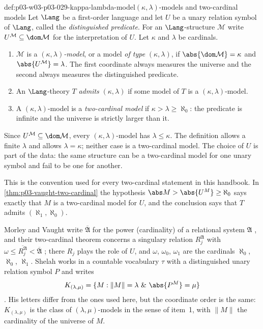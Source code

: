 \begin{hbdefinition}{def:p03-w03-p03-029-kappa-lambda-model}{\((\kappa,\lambda)\)-models and two-cardinal models}
Let \(\Lang\) be a first-order language and let \(U\) be a unary relation
symbol of \(\Lang\), called the \emph{distinguished predicate}. For an
\(\Lang\)-structure \(\mathcal M\) write \(U^{\mathcal M}\subseteq\dom\mathcal
M\) for the interpretation of \(U\). Let \(\kappa\) and \(\lambda\) be
cardinals.
\begin{enumerate}
  \item \(\mathcal M\) is a \emph{\((\kappa,\lambda)\)-model}, or a model
        \emph{of type} \((\kappa,\lambda)\), if
        \(\abs{\dom\mathcal M}=\kappa\) and \(\abs{U^{\mathcal M}}=\lambda\).
        The first coordinate always measures the universe and the second
        always measures the distinguished predicate.
  \item An \(\Lang\)-theory \(T\) \emph{admits} \((\kappa,\lambda)\) if some
        model of \(T\) is a \((\kappa,\lambda)\)-model.
  \item A \((\kappa,\lambda)\)-model is a \emph{two-cardinal model} if
        \(\kappa>\lambda\geq\aleph_0\): the predicate is infinite and the
        universe is strictly larger than it.
\end{enumerate}
Since \(U^{\mathcal M}\subseteq\dom\mathcal M\), every
\((\kappa,\lambda)\)-model has \(\lambda\leq\kappa\). The definition allows a
finite \(\lambda\) and allows \(\lambda=\kappa\); neither case is a
two-cardinal model. The choice of \(U\) is part of the data: the same
structure can be a two-cardinal model for one unary symbol and fail to be one
for another.

This is the convention used for every two-cardinal statement in this
handbook. In \cref{thm:p03-vaught-two-cardinal} the hypothesis
\(\abs M>\abs{U^M}\geq\aleph_0\) says exactly that \(M\) is a two-cardinal
model for \(U\), and the conclusion says that \(T\) admits
\((\aleph_1,\aleph_0)\).

Morley and Vaught write \(\overline{\mathfrak A}\) for the power
(cardinality) of a relational system \(\mathfrak A\)
\cite[p.~38]{MorleyVaught1962}, and their two-cardinal theorem concerns a
singulary relation \(R_j^{\mathfrak A}\) with
\(\omega\leq\overline{R_j^{\mathfrak A}}<\overline{\mathfrak A}\)
\cite[p.~55, Theorem~6.2]{MorleyVaught1962}; there \(R_j\) plays the role of
\(U\), and \(\omega\), \(\omega_0\), \(\omega_1\) are the cardinals
\(\aleph_0\), \(\aleph_0\), \(\aleph_1\). Shelah works in a countable
vocabulary \(\tau\) with a distinguished unary relation symbol \(P\) and writes
\[
  K_{(\lambda,\mu)}=\{M:\lVert M\rVert=\lambda\ \&\ \abs{P^M}=\mu\}
\]
\cite[p.~3, 0.1~Notation]{Shelah2004PairAlephN}. His letters differ from the
ones used here, but the coordinate order is the same: \(K_{(\lambda,\mu)}\) is
the class of \((\lambda,\mu)\)-models in the sense of item~1, with
\(\lVert M\rVert\) the cardinality of the universe of \(M\).
\end{hbdefinition}

